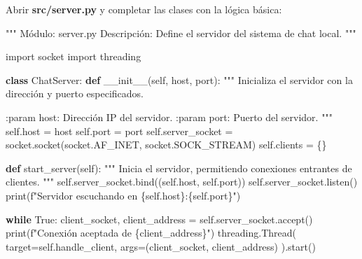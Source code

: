 \documentclass[
  a4paper,
  DIV=11,
  numbers=noendperiod,
  onepage,
  openany]{scrreprt}
\newenvironment{Shaded}{\begin{snugshade}}{\end{snugshade}}
\newcommand{\BuiltInTok}[1]{\textcolor[rgb]{0.00,0.23,0.31}{#1}}
\newcommand{\CommentTok}[1]{\textcolor[rgb]{0.37,0.37,0.37}{#1}}
\newcommand{\ControlFlowTok}[1]{\textcolor[rgb]{0.00,0.23,0.31}{\textbf{#1}}}
\newcommand{\FunctionTok}[1]{\textcolor[rgb]{0.28,0.35,0.67}{#1}}
\newcommand{\ImportTok}[1]{\textcolor[rgb]{0.00,0.46,0.62}{#1}}
\newcommand{\KeywordTok}[1]{\textcolor[rgb]{0.00,0.23,0.31}{\textbf{#1}}}
\newcommand{\NormalTok}[1]{\textcolor[rgb]{0.00,0.23,0.31}{#1}}
\newcommand{\OperatorTok}[1]{\textcolor[rgb]{0.37,0.37,0.37}{#1}}
\newcommand{\SpecialCharTok}[1]{\textcolor[rgb]{0.37,0.37,0.37}{#1}}
\newcommand{\SpecialStringTok}[1]{\textcolor[rgb]{0.13,0.47,0.30}{#1}}
\newcommand{\VariableTok}[1]{\textcolor[rgb]{0.07,0.07,0.07}{#1}}
\begin{document}
Abrir \textbf{src/server.py} y completar las clases con la lógica
básica:

\begin{Shaded}
\begin{Highlighting}[]
\CommentTok{"""}
\CommentTok{Módulo: server.py}
\CommentTok{Descripción: Define el servidor del sistema de chat local.}
\CommentTok{"""}

\ImportTok{import}\NormalTok{ socket}
\ImportTok{import}\NormalTok{ threading}

\KeywordTok{class}\NormalTok{ ChatServer:}
    \KeywordTok{def} \FunctionTok{\_\_init\_\_}\NormalTok{(}\VariableTok{self}\NormalTok{, host, port):}
        \CommentTok{"""}
\CommentTok{        Inicializa el servidor con la dirección y puerto especificados.}

\CommentTok{        :param host: Dirección IP del servidor.}
\CommentTok{        :param port: Puerto del servidor.}
\CommentTok{        """}
        \VariableTok{self}\NormalTok{.host }\OperatorTok{=}\NormalTok{ host}
        \VariableTok{self}\NormalTok{.port }\OperatorTok{=}\NormalTok{ port}
        \VariableTok{self}\NormalTok{.server\_socket }\OperatorTok{=}\NormalTok{ socket.socket(socket.AF\_INET, socket.SOCK\_STREAM)}
        \VariableTok{self}\NormalTok{.clients }\OperatorTok{=}\NormalTok{ \{\}}

    \KeywordTok{def}\NormalTok{ start\_server(}\VariableTok{self}\NormalTok{):}
        \CommentTok{"""}
\CommentTok{        Inicia el servidor, permitiendo conexiones entrantes de clientes.}
\CommentTok{        """}
        \VariableTok{self}\NormalTok{.server\_socket.bind((}\VariableTok{self}\NormalTok{.host, }\VariableTok{self}\NormalTok{.port))}
        \VariableTok{self}\NormalTok{.server\_socket.listen()}
        \BuiltInTok{print}\NormalTok{(}\SpecialStringTok{f"Servidor escuchando en }\SpecialCharTok{\{}\VariableTok{self}\SpecialCharTok{.}\NormalTok{host}\SpecialCharTok{\}}\SpecialStringTok{:}\SpecialCharTok{\{}\VariableTok{self}\SpecialCharTok{.}\NormalTok{port}\SpecialCharTok{\}}\SpecialStringTok{"}\NormalTok{)}

        \ControlFlowTok{while} \VariableTok{True}\NormalTok{:}
\NormalTok{            client\_socket, client\_address }\OperatorTok{=} \VariableTok{self}\NormalTok{.server\_socket.accept()}
            \BuiltInTok{print}\NormalTok{(}\SpecialStringTok{f"Conexión aceptada de }\SpecialCharTok{\{}\NormalTok{client\_address}\SpecialCharTok{\}}\SpecialStringTok{"}\NormalTok{)}
\NormalTok{            threading.Thread(}
\NormalTok{                target}\OperatorTok{=}\VariableTok{self}\NormalTok{.handle\_client, args}\OperatorTok{=}\NormalTok{(client\_socket, client\_address)}
\NormalTok{            ).start()}


\end{Highlighting}
\end{Shaded}
\end{document}
